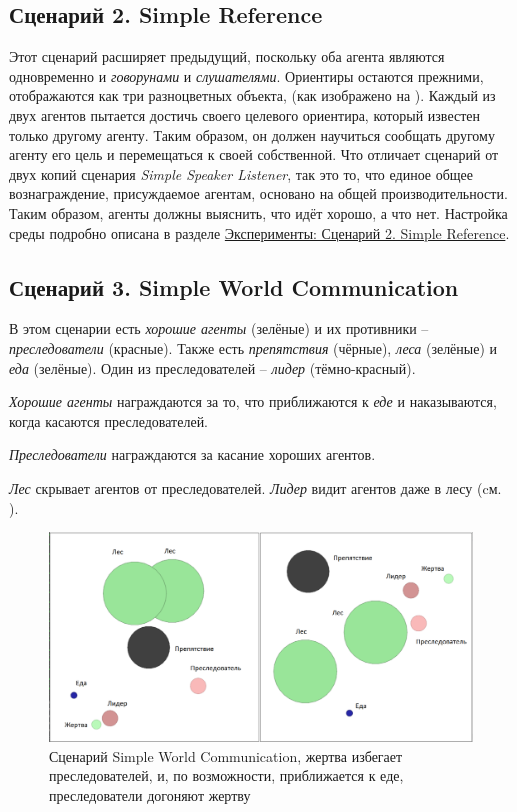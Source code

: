 \subsection{Сценарий 2. Simple Reference} \label{intro-sr}

Этот сценарий расширяет предыдущий, поскольку оба агента являются одновременно и \textit{говорунами} и \textit{слушателями}. Ориентиры остаются прежними, отображаются как три разноцветных объекта, (как изображено на ). Каждый из двух агентов пытается достичь своего целевого ориентира, который известен только другому агенту. Таким образом, он должен научиться сообщать другому агенту его цель и перемещаться к своей собственной. Что отличает сценарий от двух копий сценария \textit{Simple Speaker Listener}, так это то, что единое общее вознаграждение, присуждаемое агентам, основано на общей производительности. Таким образом, агенты должны выяснить, что идёт хорошо, а что нет. Настройка среды подробно описана в разделе \hyperref[exp-sr]{Эксперименты: Сценарий 2. Simple Reference}.

\subsection{Сценарий 3. Simple World Communication} \label{intro-swc}

В этом сценарии есть \textit{хорошие агенты} (зелёные) и их противники – \textit{преследователи} (красные). Также есть \textit{препятствия} (чёрные), \textit{леса} (зелёные) и \textit{еда} (зелёные). Один из преследователей – \textit{лидер} (тёмно-красный).

\textit{Хорошие агенты} награждаются за то, что приближаются к \textit{еде} и наказываются, когда касаются преследователей.

\textit{Преследователи} награждаются за касание хороших агентов.

\textit{Лес} скрывает агентов от преследователей. \textit{Лидер} видит агентов даже в лесу (cм. ).

\begin{figure}[ht!]
    \center
    \includegraphics [scale=0.41] {my_folder/images/intro/swc.png}
    \caption{Сценарий Simple World Communication, жертва избегает преследователей, и, по возможности, приближается к еде, преследователи догоняют жертву}
    \label{fig:swc}
\end{figure}


